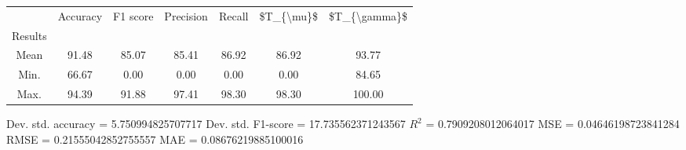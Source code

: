 \begin{tabular}{|c|c|c|c|c|c|c|}
\toprule
{} &  Accuracy &  F1 score &  Precision &  Recall &  \$T\_\{\textbackslash mu\}\$ &  \$T\_\{\textbackslash gamma\}\$ \\
Results &           &           &            &         &            &               \\
\hline
Mean    &     91.48 &     85.07 &      85.41 &   86.92 &      86.92 &         93.77 \\
Min.    &     66.67 &      0.00 &       0.00 &    0.00 &       0.00 &         84.65 \\
Max.    &     94.39 &     91.88 &      97.41 &   98.30 &      98.30 &        100.00 \\
\bottomrule
\end{tabular}

 Dev. std. accuracy = 5.750994825707717
 Dev. std. F1-score = 17.735562371243567
 $R^2$ = 0.7909208012064017
 MSE = 0.04646198723841284
 RMSE = 0.21555042852755557
 MAE = 0.08676219885100016